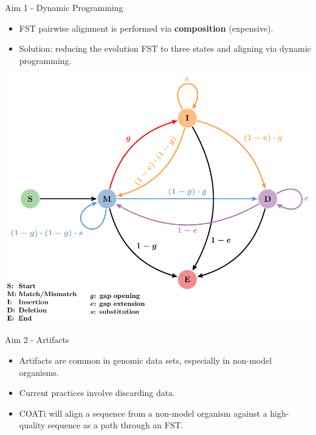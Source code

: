 \documentclass{beamer}
\begin{document}
\begin{frame}{Aim 1 - Dynamic Programming} %
\vspace{1em}
\begin{itemize}
	\item FST pairwise alignment is performed via \textbf{composition}
		(expensive).
	\item Solution: reducing the evolution FST to three states and aligning via
		dynamic programming.
\end{itemize}
\vspace{-0.75em}
\includegraphics[scale=0.5,center]{fig-dp-model.pdf}
\end{frame} %

\begin{frame}{Aim 2 - Artifacts} %
\justify
\begin{itemize}
	\setlength\itemsep{1em}
	\item Artifacts are common in genomic data sets, especially in non-model
		organisms.
	\item Current practices involve discarding data.
	\item COATi will align a sequence from a non-model organism against a
		high-quality sequence as a path through an FST.
\end{itemize}
\end{frame} %
\end{document}
